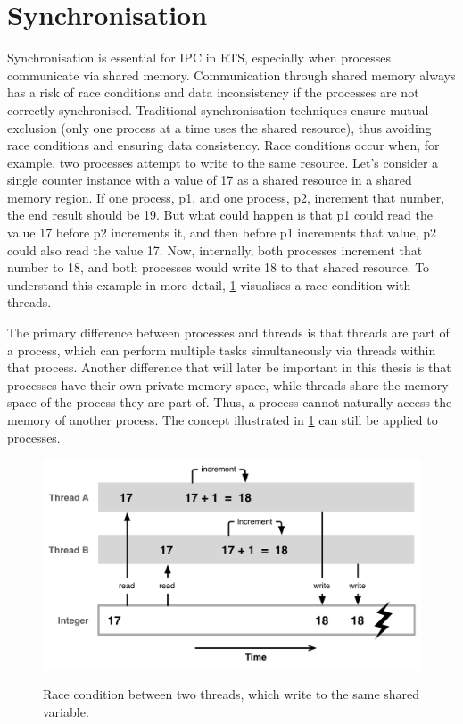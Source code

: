 \section{Synchronisation}\label{sec:synchronization}

Synchronisation is essential for \ac{IPC} in \ac{RTS}, especially when processes communicate via shared memory. Communication through shared memory always has a risk of race conditions and data inconsistency if the processes are not correctly synchronised. Traditional synchronisation techniques ensure mutual exclusion (only one process at a time uses the shared resource), thus avoiding race conditions and ensuring data consistency. Race conditions occur when, for example, two processes attempt to write to the same resource. Let's consider a single counter instance with a value of 17 as a shared resource in a shared memory region. If one process, p1, and one process, p2, increment that number, the end result should be 19. But what could happen is that p1 could read the value 17 before p2 increments it, and then before p1 increments that value, p2 could also read the value 17. Now, internally, both processes increment that number to 18, and both processes would write 18 to that shared resource. To understand this example in more detail, \cref{fig:race-condition} visualises a race condition with threads. 

The primary difference between processes and threads is that threads are part of a process, which can perform multiple tasks simultaneously via threads within that process. Another difference that will later be important in this thesis is that processes have their own private memory space, while threads share the memory space of the process they are part of. Thus, a process cannot naturally access the memory of another process. The concept illustrated in \cref{fig:race-condition} can still be applied to processes. \cite{processesVSthreads}

\begin{figure}[!ht]
    \centering
    \captionsetup{justification=centering}
    \caption{Race condition between two threads, which write to the same shared variable.}
    \includegraphics[width=115mm]{images/race-condition.png}
    \cite{Race-Condition}
    \label{fig:race-condition}
\end{figure}

